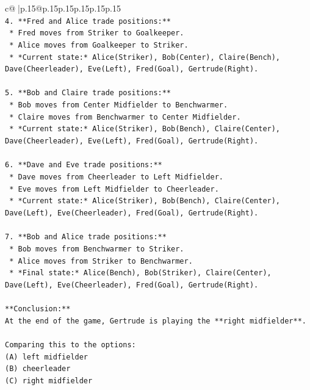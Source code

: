 \documentclass{article}
\begin{document}
{\begin{supertabular}{c@{$\;$}|p{.15\linewidth}@{}p{.15\linewidth}p{.15\linewidth}p{.15\linewidth}p{.15\linewidth}p{.15\linewidth}}
{{{\\ 
\texttt{4.  **Fred and Alice trade positions:**} \\
\texttt{    *   Fred moves from Striker to Goalkeeper.} \\
\texttt{    *   Alice moves from Goalkeeper to Striker.} \\
\texttt{    *   *Current state:* Alice(Striker), Bob(Center), Claire(Bench), Dave(Cheerleader), Eve(Left), Fred(Goal), Gertrude(Right).} \\
\\ 
\texttt{5.  **Bob and Claire trade positions:**} \\
\texttt{    *   Bob moves from Center Midfielder to Benchwarmer.} \\
\texttt{    *   Claire moves from Benchwarmer to Center Midfielder.} \\
\texttt{    *   *Current state:* Alice(Striker), Bob(Bench), Claire(Center), Dave(Cheerleader), Eve(Left), Fred(Goal), Gertrude(Right).} \\
\\ 
\texttt{6.  **Dave and Eve trade positions:**} \\
\texttt{    *   Dave moves from Cheerleader to Left Midfielder.} \\
\texttt{    *   Eve moves from Left Midfielder to Cheerleader.} \\
\texttt{    *   *Current state:* Alice(Striker), Bob(Bench), Claire(Center), Dave(Left), Eve(Cheerleader), Fred(Goal), Gertrude(Right).} \\
\\ 
\texttt{7.  **Bob and Alice trade positions:**} \\
\texttt{    *   Bob moves from Benchwarmer to Striker.} \\
\texttt{    *   Alice moves from Striker to Benchwarmer.} \\
\texttt{    *   *Final state:* Alice(Bench), Bob(Striker), Claire(Center), Dave(Left), Eve(Cheerleader), Fred(Goal), Gertrude(Right).} \\
\\ 
\texttt{**Conclusion:**} \\
\texttt{At the end of the game, Gertrude is playing the **right midfielder**.} \\
\\ 
\texttt{Comparing this to the options:} \\
\texttt{(A) left midfielder} \\
\texttt{(B) cheerleader} \\
\texttt{(C) right midfielder} \\
}}}
\end{supertabular}}
\end{document}
